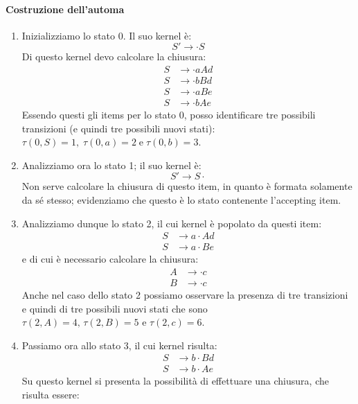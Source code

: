 \documentclass[class=book, crop=false, oneside, 12pt]{standalone}
\begin{document}
\paragraph{Costruzione dell'automa}
\begin{enumerate}
    \item Inizializziamo lo stato 0. Il suo kernel è:
    \begin{equation*}
        S' \to \cdot S
    \end{equation*}
    Di questo kernel devo calcolare la chiusura:
    \begin{align*}
        S &\to \cdot aAd \\
    	S &\to \cdot bBd \\
    	S &\to \cdot aBe \\
    	S &\to \cdot bAe
    \end{align*}
    Essendo questi gli items per lo stato 0, posso identificare tre possibili transizioni (e quindi tre possibili nuovi stati): \(\tau(0,S)=1, \; \tau(0,a)=2 \; \textrm{e} \; \tau(0,b)=3\).
    \item Analizziamo ora lo stato 1; il suo kernel è:
    \begin{equation*}
        S' \to S \cdot    
    \end{equation*}
    Non serve calcolare la chiusura di questo item, in quanto è formata solamente da sé stesso; evidenziamo che questo è lo stato contenente l'accepting item.
    \item Analizziamo dunque lo stato 2, il cui kernel è popolato da questi item:
    \begin{align*}
        S &\to a \cdot Ad \\
        S &\to a \cdot Be
    \end{align*}
    e di cui è necessario calcolare la chiusura:
    \begin{align*}
        A &\to \cdot c \\
        B &\to \cdot c
    \end{align*}
    Anche nel caso dello stato 2 possiamo osservare la presenza di tre transizioni e quindi di tre possibili nuovi stati che sono \(\tau(2,A)=4 \textrm{, } \tau(2,B)=5 \textrm{ e } \tau(2,c)=6\).
    \item Passiamo ora allo stato 3, il cui kernel risulta:
    \begin{align*}
        S &\to b \cdot Bd \\
        S &\to b \cdot Ae
    \end{align*}
    Su questo kernel si presenta la possibilità di effettuare una chiusura, che risulta essere:

\end{enumerate}
\end{document}
